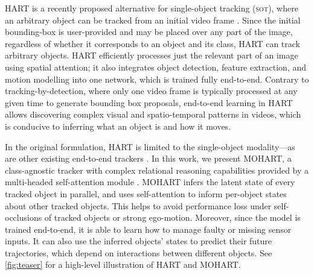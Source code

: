 \Gls{HART} is a recently proposed alternative for single-object tracking (\textsc{sot}), where an arbitrary object can be tracked from an initial video frame \citep{Kosiorek2017hierch}.
%
Since the initial bounding-box is user-provided and may be placed over any part of the image, regardless of whether it corresponds to an object and its class, \gls{HART} can track arbitrary objects.
% 
\Gls{HART} efficiently processes just the relevant part of an image using spatial attention; it also integrates object detection, feature extraction, and motion modelling into one network, which is trained fully end-to-end.
Contrary to tracking-by-detection, where only one video frame is typically processed at any given time to generate bounding box proposals, end-to-end learning in \gls{HART} allows discovering complex visual and spatio-temporal patterns in videos, which is conducive to inferring what an object is and how it moves.
%

In the original formulation, \gls{HART} is limited to the single-object modality---as are other existing end-to-end trackers \cite{Kahou2015ratm,Danesh2019deep,Gordon2018re3}.
%
In this work, we present \gls{MOHART}, a class-agnostic tracker with complex relational reasoning capabilities provided by a multi-headed self-attention module \citep{Vaswani17,Lee2019set}. 
\Gls{MOHART} infers the latent state of every tracked object in parallel, and uses self-attention to inform per-object states about other tracked objects.
This helps to avoid performance loss under self-occlusions of tracked objects or strong ego-motion.
Moreover, since the model is trained end-to-end, it is able to learn how to manage faulty or missing sensor inputs.
It can also use the inferred objects' states to predict their future trajectories, which depend on interactions between different objects. See \cref{fig:teaser} for a high-level illustration of \gls{HART} and \gls{MOHART}.

